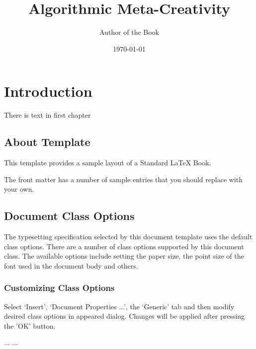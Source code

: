 \documentclass[a4paper]{book}
\begin{document}
\title{\Huge\bf Algorithmic Meta-Creativity}
\author{Author of the Book}
\date{\today}
\maketitle

\tableofcontents


\chapter{\textsf{\textcolor[rgb]{0.180392,0.333333,0.839216}{Introduction}}}
There is text in first chapter

\section{About Template}
This template provides a sample layout of a Standard \LaTeX{} Book.

The front matter has a number of sample entries that you should replace
with your own. 

\section{Document Class Options}
The typesetting specification selected by this document template
uses the default class options. There are a number of class options 
supported by this document class. The available options include 
setting the paper size, the point size of the font used in the 
document body and others.

\subsection{Customizing Class Options}
Select `Insert', `Document Properties ...', the `Generic' tab
and then modify desired class options in appeared dialog.
Changes will be applied after pressing the 'OK' button.



\begin{thebibliography}{99}
 ...
 ...
\end{thebibliography}

\printindex
\end{document}

